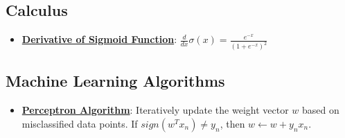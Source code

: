 \documentclass{article}%
\begin{document}
%
\subsection{Calculus}%
\label{subsec:Calculus}%
\begin{itemize}[leftmargin=*]%
\item \href{\url{https://purdue.brightspace.com/d2l/common/assets/pdfjs-d2l-dist/1.0.14-legacy/web/viewer.html?file=\%252Fcontent\%252Fenforced\%252F1095467-wl.202510.CS.24300.001\%252F04L1-Linear\%20Algebra\%20Primer.pdf\%253Fou\%253D1095467\&lang=en-us\&container=d2l-fileviewer-rendered-pdf\&fullscreen=d2l-fileviewer-rendered-pdf-dialog\&height=667}#page=21}{\textbf{Derivative of Sigmoid Function}}: $\frac{d}{dx} \sigma(x) = \frac{e^{-x}}{(1 + e^{-x})^2}$%
\end{itemize}

%
\subsection{Machine Learning Algorithms}%
\label{subsec:MachineLearningAlgorithms}%
\begin{itemize}[leftmargin=*]%
\item \href{\url{https://purdue.brightspace.com/d2l/common/assets/pdfjs-d2l-dist/1.0.14-legacy/web/viewer.html?file=\%252Fcontent\%252Fenforced\%252F1095467-wl.202510.CS.24300.001\%252F05L2-ML\%20Basics.pdf\%253Fou\%253D1095467\&lang=en-us\&container=d2l-fileviewer-rendered-pdf\&fullscreen=d2l-fileviewer-rendered-pdf-dialog\&height=667}#page=30}{\textbf{Perceptron Algorithm}}: Iteratively update the weight vector $w$ based on misclassified data points. If $sign(w^Tx_n) \ne y_n$, then $w \leftarrow w + y_nx_n$.%
\end{itemize}

%
\end{document}
